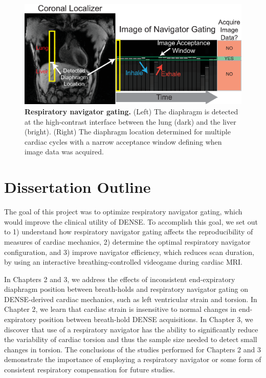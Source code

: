 	\begin{figure}
		\centering
		\includegraphics{figures/intro/navigator_gating_explanation}
		\caption[Respiratory navigator gating]{\textbf{Respiratory navigator gating.} (Left) The diaphragm is detected at the high-contrast interface between the lung (dark) and the liver (bright). (Right) The diaphragm location determined for multiple cardiac cycles with a narrow acceptance window	defining when image data was acquired.}
		\label{fig:navigator_gating_explanation}
	\end{figure}

\section{Dissertation Outline}
	The goal of this project was to optimize respiratory navigator gating, which would improve the clinical utility of DENSE. To accomplish this goal, we set out to 1) understand how respiratory navigator gating affects the reproducibility of measures of cardiac mechanics, 2) determine the optimal respiratory navigator configuration, and 3) improve navigator efficiency, which reduces scan duration, by using an interactive breathing-controlled videogame during cardiac MRI.
	
	\indent In Chapters 2 and 3, we address the effects of inconsistent end-expiratory diaphragm position between breath-holds and respiratory navigator gating on DENSE-derived cardiac mechanics, such as left ventricular strain and torsion. In Chapter 2, we learn that cardiac strain is insensitive to normal changes in end-expiratory position between breath-hold DENSE acquisitions. In Chapter 3, we discover that use of a respiratory navigator has the ability to significantly reduce the variability of cardiac torsion and thus the sample size needed to detect small changes in torsion. The conclusions of the studies performed for Chapters 2 and 3 demonstrate the importance of employing a respiratory navigator or some form of consistent respiratory compensation for future studies.
	
